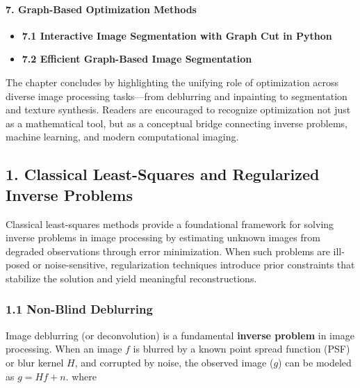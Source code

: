\documentclass[11pt]{article}
\providecommand{\tightlist}{%
      \setlength{\itemsep}{0pt}\setlength{\parskip}{0pt}}
\begin{document}
\hypertarget{graph-based-optimization-methods}{%
\paragraph{7. Graph-Based Optimization
Methods}\label{graph-based-optimization-methods}}

\begin{itemize}
\tightlist
\item
  \textbf{7.1 Interactive Image Segmentation with Graph Cut in Python}
\item
  \textbf{7.2 Efficient Graph-Based Image Segmentation}
\end{itemize}

The chapter concludes by highlighting the unifying role of optimization
across diverse image processing tasks---from deblurring and inpainting
to segmentation and texture synthesis. Readers are encouraged to
recognize optimization not just as a mathematical tool, but as a
conceptual bridge connecting inverse problems, machine learning, and
modern computational imaging.

    \hypertarget{classical-least-squares-and-regularized-inverse-problems}{%
\subsection{\texorpdfstring{\textbf{1. Classical Least-Squares and
Regularized Inverse
Problems}}{1. Classical Least-Squares and Regularized Inverse Problems}}\label{classical-least-squares-and-regularized-inverse-problems}}

Classical least-squares methods provide a foundational framework for
solving inverse problems in image processing by estimating unknown
images from degraded observations through error minimization. When such
problems are ill-posed or noise-sensitive, regularization techniques
introduce prior constraints that stabilize the solution and yield
meaningful reconstructions.

\hypertarget{non-blind-deblurring}{%
\subsubsection{\texorpdfstring{\textbf{1.1 Non-Blind
Deblurring}}{1.1 Non-Blind Deblurring}}\label{non-blind-deblurring}}

Image deblurring (or deconvolution) is a fundamental \textbf{inverse
problem} in image processing. When an image \(f\) is blurred by a known
point spread function (PSF) or blur kernel \(H\), and corrupted by
noise, the observed image (\(g\)) can be modeled as \(g = Hf + n\).
where
\end{document}

